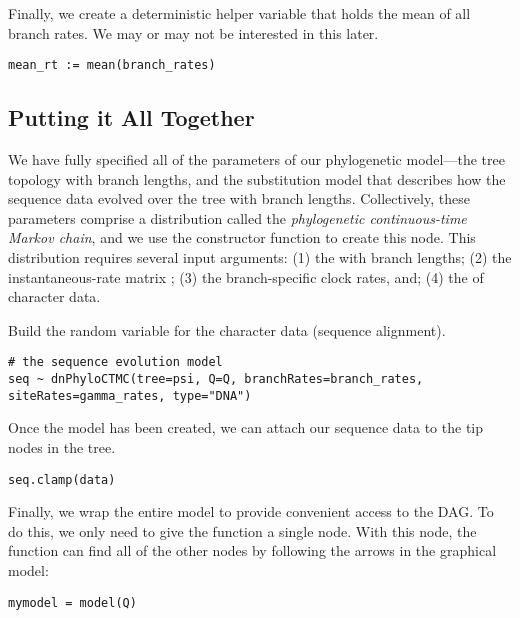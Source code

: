 Finally, we create a deterministic helper variable that holds the mean of all branch rates.
We may or may not be interested in this later.
{\tt \begin{snugshade*}
\begin{lstlisting}
mean_rt := mean(branch_rates)
\end{lstlisting}
\end{snugshade*}}



\subsection{Putting it All Together}

We have fully specified all of the parameters of our phylogenetic model---the tree topology with branch lengths, and the substitution model that describes how the sequence data evolved over the tree with branch lengths.  
Collectively, these parameters comprise a distribution called the \textit{phylogenetic continuous-time Markov chain}, and we use the  constructor function to create this node.
This distribution requires several input arguments: 
(1) the  with branch lengths; 
(2) the instantaneous-rate matrix ;
(3) the branch-specific clock rates, and; 
(4) the  of character data.


Build the random variable for the character data (sequence alignment).
{\tt \begin{snugshade*}
\begin{lstlisting}
# the sequence evolution model
seq ~ dnPhyloCTMC(tree=psi, Q=Q, branchRates=branch_rates, siteRates=gamma_rates, type="DNA")
\end{lstlisting}
\end{snugshade*}}


Once the  model has been created, we can attach our sequence data to the tip nodes in the tree.
{\tt \begin{snugshade*}
\begin{lstlisting}
seq.clamp(data)
\end{lstlisting}
\end{snugshade*}}
Finally, we wrap the entire model to provide convenient access to the DAG. 
To do this, we only need to give the  function a single node. 
With this node, the  function can find all of the other nodes by following the arrows in the graphical model:
{\tt \begin{snugshade*}
\begin{lstlisting}
mymodel = model(Q)
\end{lstlisting}
\end{snugshade*}}

